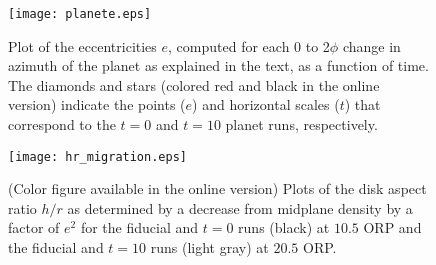 \documentclass[12pt,manuscript,authoryear]{aastex}
\begin{document}
\begin{figure}[t]
\center
\texttt{[image: planete.eps]}
\caption{Plot of the eccentricities $e$, computed for each 0 to 2$\phi$ change in azimuth of the planet as explained in
  the text, as a function of time. The diamonds and stars (colored red and black in the online version) indicate the
  points ($e$) and horizontal scales ($t$) that correspond to the $t = 0$ and $t = 10$ planet runs, respectively.}
\label{fig:e}
\end{figure}

\begin{figure}[t]
\center
\texttt{[image: hr\_migration.eps]}
\caption{(Color figure available in the online version) Plots of the disk aspect ratio $h/r$ as determined by a decrease
  from midplane density by a factor of $e^2$ for the fiducial and $t=0$ runs (black) at $10.5$ ORP and the fiducial and
  $t=10$ runs (light gray) at $20.5$ ORP.}
\label{fig:hr}
\end{figure}


\label{lastpage}
\end{document}
